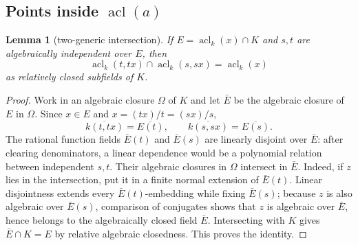 \documentclass[11pt,oneside]{article}
\newtheorem{lemma}[theorem]{Lemma}
\theoremstyle{definition}
\theoremstyle{remark}
\newcommand{\acl}{\operatorname{acl}}
\begin{document}
\subsection[Points inside the closure of a]
{Points inside $\acl(a)$}

\begin{lemma}[two-generic intersection]\label{lem:two-generic-intersection}
If $E=\acl_k(x)\cap K$ and $s,t$ are algebraically independent over $E$, then
\[
 \acl_k(t,tx)\cap\acl_k(s,sx)=\acl_k(x)
\]
as relatively closed subfields of $K$.
\end{lemma}
\begin{proof}
Work in an algebraic closure $\Omega$ of $K$ and let $\bar E$ be the algebraic closure
of $E$ in $\Omega$.  Since $x\in E$ and $x=(tx)/t=(sx)/s$,
\[
 \overline{k(t,tx)}=\overline{E(t)},\qquad
 \overline{k(s,sx)}=\overline{E(s)}.
\]
The rational function fields $\bar E(t)$ and $\bar E(s)$ are linearly disjoint over
$\bar E$: after clearing denominators, a linear dependence would be a polynomial
relation between independent $s,t$.  Their algebraic closures in $\Omega$ intersect in
$\bar E$.  Indeed, if $z$ lies in the intersection, put it in a finite normal extension
of $\bar E(t)$.  Linear disjointness extends every $\bar E(t)$-embedding while fixing
$\bar E(s)$; because $z$ is also algebraic over $\bar E(s)$, comparison of conjugates
shows that $z$ is algebraic over $\bar E$, hence belongs to the algebraically closed field
$\bar E$.  Intersecting with $K$ gives $\bar E\cap K=E$ by relative algebraic
closedness.  This proves the identity.
\end{proof}
\end{document}
